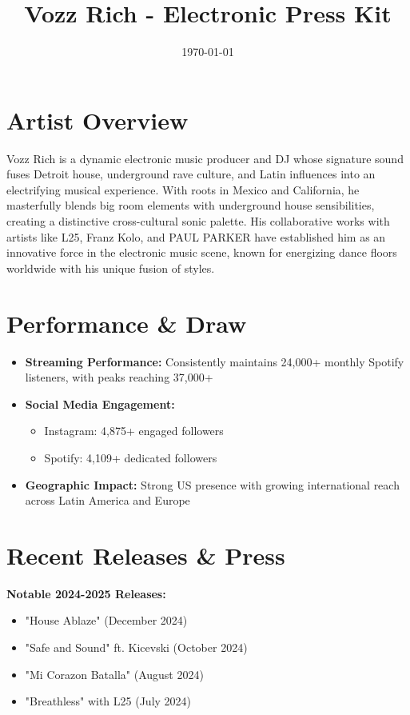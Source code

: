 \documentclass{article}
\title{\emoji{microphone} Vozz Rich - Electronic Press Kit}
\date{\today}
\begin{document}
\maketitle

\section*{ Artist Overview}
Vozz Rich is a dynamic electronic music producer and DJ whose signature sound fuses Detroit house, underground rave culture, and Latin influences into an electrifying musical experience. With roots in Mexico and California, he masterfully blends big room elements with underground house sensibilities, creating a distinctive cross-cultural sonic palette. His collaborative works with artists like L25, Franz Kolo, and PAUL PARKER have established him as an innovative force in the electronic music scene, known for energizing dance floors worldwide with his unique fusion of styles.

\section*{ Performance \& Draw}
\begin{itemize}
\item \textbf{Streaming Performance:} Consistently maintains 24,000+ monthly Spotify listeners, with peaks reaching 37,000+
\item \textbf{Social Media Engagement:}
    \begin{itemize}
    \item Instagram: 4,875+ engaged followers
    \item Spotify: 4,109+ dedicated followers
    \end{itemize}
\item \textbf{Geographic Impact:} Strong US presence with growing international reach across Latin America and Europe
\end{itemize}

\section*{ Recent Releases \& Press}
\textbf{Notable 2024-2025 Releases:}
\begin{itemize}
\item "House Ablaze" (December 2024)
\item "Safe and Sound" ft. Kicevski (October 2024)
\item "Mi Corazon Batalla" (August 2024)
\item "Breathless" with L25 (July 2024)
\end{itemize}
\end{document}
